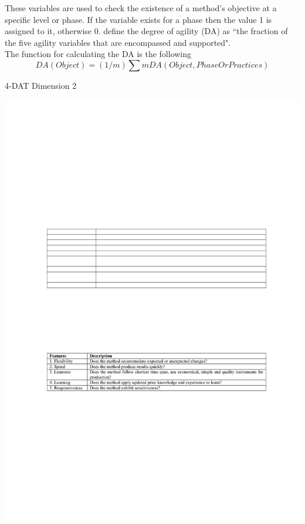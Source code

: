 These variables are used to check the existence of a method's objective at a specific level or phase. If the variable exists for a phase then the value 1 is assigned to it, otherwise 0. \citet{qumer2006measuring} define the degree of agility (DA) as ``the fraction of the five agility variables that are encompassed and supported".\\ %

The function for calculating the DA is the following\\
\begin{equation} DA (Object) = (1/m) \sum m DA(Object, Phase Or Practices) \end{equation}

\begin{table}[H]
\caption{4-DAT Dimension 2}
\label{fig:dimension2}
\centerline{\includegraphics[scale=0.8]{include/relatedwork/fig/qumer_dimension2.pdf}}
\end{table}

